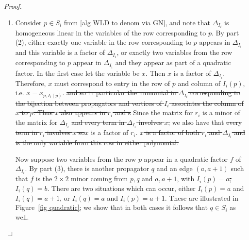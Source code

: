 \documentclass[11pt]{article}
\theoremstyle{remark}
\theoremstyle{definition}
\begin{document}
\begin{proof}
\begin{enumerate}
As in the proof of part (2), make a new admissible diagram by removing the propagators which come before {\color{violet} those contibuting to} $f$ {\color{violet}in the order imposed by $I_i$} and set $i=a$. The cases in the proof of part (2) show how $\Delta_{I_i}$ factors: in particular the vertices supporting the other end of $p$ either do not appear in $I_i$, or they contribute to a different factor of $\Delta_{I_i}$ than $p$ and $a$ do.  By assumption $b$ contributes to the same factor as $a$.  Therefore $(a,b)$ is an edge defining an end of $p$, that is, $b = a+1$.

\item Consider $p\in S_i$ from \ref{alg WLD to denom via GN}, and note that $\Delta_{I_i}$ is homogeneous linear in the variables of the row corresponding to $p$.  By part (2), either exactly one variable in the row corresponding to $p$ appears in $\Delta_{I_i}$ and this variable is a factor of $\Delta_{I_i}$, or exactly two variables from the row corresponding to $p$ appear in $\Delta_{I_i}$ and they appear as part of a quadratic factor.  In the first case let the variable be $x$. Then $x$ is a factor of $\Delta_{I_i}$. {\color{violet} Therefore, $x$ must correspond to entry in the row of $p$ and column of $I_i(p)$, i.e. $x = x_{p, I_i(p)}$.} \st{and so in particular the monomial in $\Delta_{I_i}$ corresponding to the bijection between propagators and vertices of $I_i$ associates the column of $x$ to $p$. Thus $x$ also appears in $r_i$ and s} Since the matrix for $r_i$ is a minor of the matrix for $\Delta_{I_i}$ \st{and every term in $\Delta_{I_i}$ involves $x$,} we also have that \st{every term in $r_i$ involves $x$ so}{\color{violet}$x$ is a factor of $r_i$.} \st{$x$ is a factor of both $r_i$ and $\Delta_{I_i}$ and is the only variable from this row in either polynomial.}

Now suppose two variables from the row $p$ appear in a quadratic factor $f$ of $\Delta_{I_i}$.  By part (3), there is another propagator $q$ and an edge $(a,a+1)$ such that $f$ is the $2\times 2$ minor coming from $p, q$ and $a, a+1$, with \st{$I_i(p)=a$, $I_i(q)=b$}.  {\color{violet}There are two situations which can occur, either $I_i(p)=a$ and $I_i(q)=a+1$, or $I_i(q)=a$ and $I_i(p)=a+1$. These are} illustrated in Figure~\ref{fig quadratic}; we show that in both cases it follows that $q \in S_i$ as well.


\end{enumerate}
\end{proof}
\end{document}
